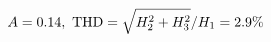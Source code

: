 \documentclass[preview]{standalone}
\begin{document}
\begin{align*}
\special{dvisvgm:raw <g id='unique000'>}A=0.14,\ \text{THD}=\sqrt{H_2^2+H_3^2}/H_1=2.9\%\special{dvisvgm:raw </g>}
\end{align*}
\end{document}
